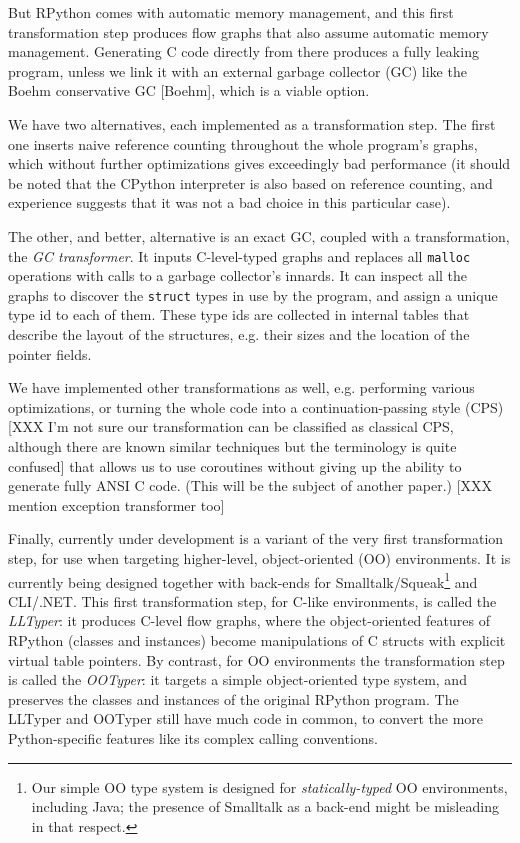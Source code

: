 \documentclass{acm_proc_article-sp}
\begin{document}
But RPython comes with automatic memory management, and this first
transformation step produces flow graphs that also assume automatic
memory management.  Generating C code directly from there produces a
fully leaking program, unless we link it with an external garbage
collector (GC) like the Boehm conservative GC [Boehm], which is a
viable option.

We have two alternatives, each implemented as a transformation step.
The first one inserts naive reference counting throughout the whole
program's graphs, which without further optimizations gives exceedingly
bad performance (it should be noted that the CPython interpreter is also
based on reference counting, and experience suggests that it was not a
bad choice in this particular case).

The other, and better, alternative is an exact GC, coupled with a
transformation, the \textit{GC transformer}.  It inputs C-level-typed graphs
and replaces all \texttt{malloc} operations with calls to a garbage
collector's innards.  It can inspect all the graphs to discover the
\texttt{struct} types in use by the program, and assign a unique type id to
each of them.  These type ids are collected in internal tables that
describe the layout of the structures, e.g. their sizes and the location
of the pointer fields.

We have implemented other transformations as well, e.g. performing
various optimizations, or turning the whole code into a
continuation-passing style (CPS) [XXX I'm not sure our transformation
can be classified as classical CPS, although there are known similar techniques but the terminology is quite confused] that allows us to use coroutines
without giving up the ability to generate fully ANSI C code.  (This will
be the subject of another paper.)  [XXX mention exception transformer too]

Finally, currently under development is a variant of the very first
transformation step, for use when targeting higher-level,
object-oriented (OO) environments.  It is currently being designed
together with back-ends for Smalltalk/Squeak\footnote{Our simple OO
type system is designed for \textit{statically-typed} OO environments,
including Java; the presence of Smalltalk as a back-end might be
misleading in that respect.} and CLI/.NET.  This first transformation
step, for C-like environments, is called the \textit{LLTyper}: it produces
C-level flow graphs, where the object-oriented features of RPython
(classes and instances) become manipulations of C structs with
explicit virtual table pointers.  By contrast, for OO environments the
transformation step is called the \textit{OOTyper}: it targets a simple
object-oriented type system, and preserves the classes and instances
of the original RPython program.  The LLTyper and OOTyper still have
much code in common, to convert the more Python-specific features like
its complex calling conventions.
\end{document}

